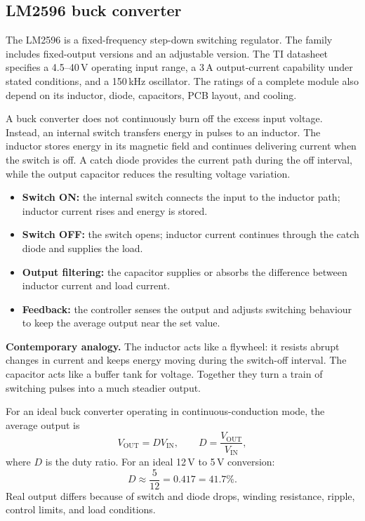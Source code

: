 \documentclass[journal,12pt,twocolumn]{IEEEtran}
\begin{document}
\subsection{LM2596 buck converter}
The LM2596 is a fixed-frequency step-down switching regulator.
The family includes fixed-output versions and an adjustable version.
The TI datasheet specifies a 4.5--40\,V operating input range,
a 3\,A output-current capability under stated conditions, and a
150\,kHz oscillator. The ratings of a complete module also depend
on its inductor, diode, capacitors, PCB layout, and cooling.

A buck converter does not continuously burn off the excess input
voltage. Instead, an internal switch transfers energy in pulses to
an inductor. The inductor stores energy in its magnetic field and
continues delivering current when the switch is off. A catch diode
provides the current path during the off interval, while the output
capacitor reduces the resulting voltage variation.

\begin{itemize}[leftmargin=1.5em]
    \item \textbf{Switch ON:} the internal switch connects the input
    to the inductor path; inductor current rises and energy is stored.
    \item \textbf{Switch OFF:} the switch opens; inductor current
    continues through the catch diode and supplies the load.
    \item \textbf{Output filtering:} the capacitor supplies or absorbs
    the difference between inductor current and load current.
    \item \textbf{Feedback:} the controller senses the output and
    adjusts switching behaviour to keep the average output near
    the set value.
\end{itemize}

\textbf{Contemporary analogy.} The inductor acts like a flywheel:
it resists abrupt changes in current and keeps energy moving during
the switch-off interval. The capacitor acts like a buffer tank for
voltage. Together they turn a train of switching pulses into a
much steadier output.

For an ideal buck converter operating in continuous-conduction
mode, the average output is
\begin{equation}
    \boxed{V_{\mathrm{OUT}}=D V_{\mathrm{IN}},\qquad
    D=\frac{V_{\mathrm{OUT}}}{V_{\mathrm{IN}}},}
    \label{eq:buck-duty}
\end{equation}
where $D$ is the duty ratio. For an ideal 12\,V to 5\,V conversion:
\begin{equation}
    D\approx\frac{5}{12}=0.417=41.7\%.
\end{equation}
Real output differs because of switch and diode drops, winding
resistance, ripple, control limits, and load conditions.
\end{document}
